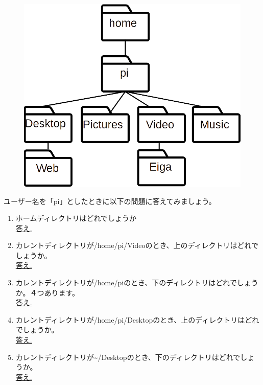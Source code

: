 \begin{tcolorbox}[title=\useOmetoi]
\begin{figure}[H]
 \centering
 \includegraphics[width=0.6\linewidth]{images/chap03/text03-img005.png}
\end{figure}
ユーザー名を「pi」としたときに以下の問題に答えてみましょう。
\begin{enumerate}
\item ホームディレクトリはどれでしょうか\\
\underline{答え.\hspace{0.8\linewidth}}
\item カレントディレクトリが/home/pi/Videoのとき、上のディレクトリはどれでしょうか。\\
\underline{答え.\hspace{0.8\linewidth}}
\item カレントディレクトリが/home/piのとき、下のディレクトリはどれでしょうか。４つあります。\\
\underline{答え.\hspace{0.8\linewidth}}
\item カレントディレクトリが/home/pi/Desktopのとき、上のディレクトリはどれでしょうか。\\
\underline{答え.\hspace{0.8\linewidth}}
\item カレントディレクトリが\textasciitilde /Desktopのとき、下のディレクトリはどれでしょうか。\\
\underline{答え.\hspace{0.8\linewidth}}
\end{enumerate}
\end{tcolorbox}
　
